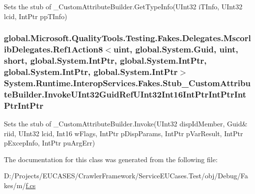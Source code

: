 Sets the stub of \-\_\-\-Custom\-Attribute\-Builder.\-Get\-Type\-Info(\-U\-Int32 i\-T\-Info, U\-Int32 lcid, Int\-Ptr pp\-T\-Info)

\hypertarget{class_system_1_1_runtime_1_1_interop_services_1_1_fakes_1_1_stub___custom_attribute_builder_acef69eae5c138852a7c577bc9ccd4874}{
\subsubsection[{Invoke\-U\-Int32\-Guid\-Ref\-U\-Int32\-Int16\-Int\-Ptr\-Int\-Ptr\-Int\-Ptr\-Int\-Ptr}]{\setlength{\rightskip}{0pt plus 5cm}global.\-Microsoft.\-Quality\-Tools.\-Testing.\-Fakes.\-Delegates.\-Mscorlib\-Delegates.\-Ref1\-Action8$<$uint, global.\-System.\-Guid, uint, short, global.\-System.\-Int\-Ptr, global.\-System.\-Int\-Ptr, global.\-System.\-Int\-Ptr, global.\-System.\-Int\-Ptr$>$ System.\-Runtime.\-Interop\-Services.\-Fakes.\-Stub\-\_\-\-Custom\-Attribute\-Builder.\-Invoke\-U\-Int32\-Guid\-Ref\-U\-Int32\-Int16\-Int\-Ptr\-Int\-Ptr\-Int\-Ptr\-Int\-Ptr}}\label{class_system_1_1_runtime_1_1_interop_services_1_1_fakes_1_1_stub___custom_attribute_builder_acef69eae5c138852a7c577bc9ccd4874}


Sets the stub of \-\_\-\-Custom\-Attribute\-Builder.\-Invoke(U\-Int32 disp\-Id\-Member, Guid\& riid, U\-Int32 lcid, Int16 w\-Flags, Int\-Ptr p\-Disp\-Params, Int\-Ptr p\-Var\-Result, Int\-Ptr p\-Excep\-Info, Int\-Ptr pu\-Arg\-Err)



The documentation for this class was generated from the following file\-:\begin{DoxyCompactItemize}
\item 
D\-:/\-Projects/\-E\-U\-C\-A\-S\-E\-S/\-Crawler\-Framework/\-Service\-E\-U\-Cases.\-Test/obj/\-Debug/\-Fakes/m/\hyperlink{m_2f_8cs}{f.\-cs}\end{DoxyCompactItemize}
